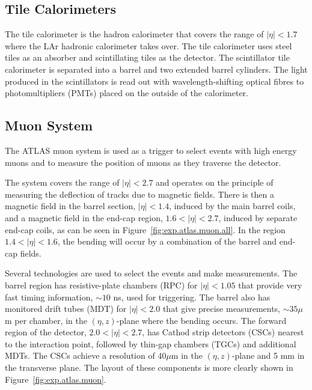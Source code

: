 \subsection*{Tile Calorimeters}

The tile calorimeter  is the hadron calorimeter that covers the range of $|\eta| < 1.7$
where the LAr hadronic calorimeter takes over.
The tile calorimeter uses steel tiles as an absorber and scintillating tiles as the detector.
The scintillator tile calorimeter is separated into a barrel and two extended barrel cylinders.
The light produced in the scintillators is read out with wavelength-shifting optical fibres to photomultipliers (PMTs) placed on the outside of the calorimeter. 


\subsection{Muon System}

The ATLAS muon system is used as a trigger to select events with high energy muons and to measure the position of muons
as they traverse the detector.


The system covers the range of $|\eta| < 2.7$ and operates on the principle of measuring the deflection of tracks due to magnetic fields.
There is then a magnetic field in the barrel section, $|\eta| < 1.4$, induced by the main barrel coils, 
and a magnetic field in the end-cap region, $1.6 < |\eta| < 2.7$, induced by separate end-cap coils, as can be 
seen in Figure~\ref{fig:exp.atlas.muon.all}.
In the region $1.4 < |\eta| < 1.6$, the bending will occur by a combination of the barrel and end-cap fields.

Several technologies are used to select the events and make measurements.
The barrel region has resistive-plate chambers (RPC) for $|\eta| < 1.05$  that provide very fast timing information, $\sim 10$ ns,
used for triggering. The barrel also has monitored drift tubes (MDT) for $|\eta| < 2.0$ that give precise measurements, $\sim 35 \mu$m per chamber,
in the $\left(\eta,z\right)$-plane where the bending occurs.
The forward region of the detector, $2.0 < |\eta| < 2.7$,  has Cathod strip detectors (CSCs)  nearest to the interaction point,
followed by thin-gap chambers (TGCs) and additional MDTs. The CSCs achieve a resolution of 40$\mu$m in the $\left(\eta,z\right)$-plane
and 5 mm in the transverse plane.
The layout of these components is more clearly shown in Figure~\ref{fig:exp.atlas.muon}.


